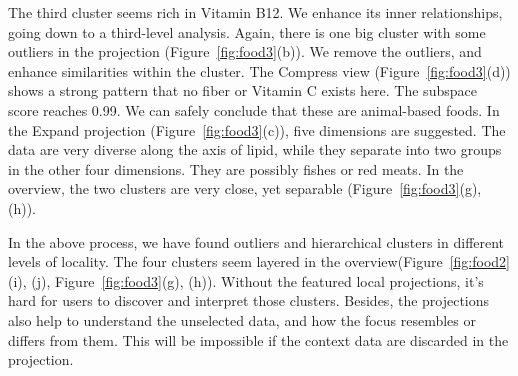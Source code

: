 The third cluster seems rich in Vitamin B12. We enhance its inner relationships, going down to a third-level analysis. Again, there is one big cluster with some outliers in the projection (Figure~\ref{fig:food3}(b)). We remove the outliers, and enhance similarities within the cluster. The Compress view (Figure~\ref{fig:food3}(d)) shows a strong pattern that no fiber or Vitamin C exists here. The subspace score reaches 0.99. We can safely conclude that these are animal-based foods. In the Expand projection (Figure~\ref{fig:food3}(c)), five dimensions are suggested. The data are very diverse along the axis of lipid, while they separate into two groups in the other four dimensions. They are possibly fishes or red meats. In the overview, the two clusters are very close, yet separable (Figure~\ref{fig:food3}(g), (h)).

In the above process, we have found outliers and hierarchical clusters in different levels of locality. The four clusters seem layered in the overview(Figure~\ref{fig:food2}(i), (j), Figure~\ref{fig:food3}(g), (h)). Without the featured local projections, it's hard for users to discover and interpret those clusters. Besides, the projections also help to understand the unselected data, and how the focus resembles or differs from them. This will be impossible if the context data are discarded in the projection.


\label{section:casestudy}